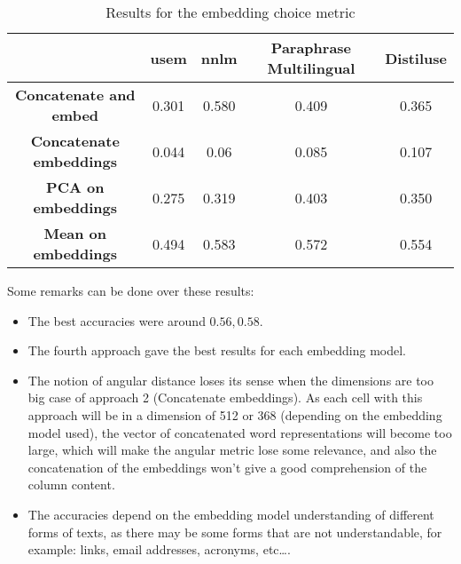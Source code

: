 \begin{table}[h]
    \begin{center}
        \begin{tabular}{|c | c | c | c| c|}
            \hline
                                            & \textbf{\acrshort{usem}}         &
            \textbf{\acrshort{nnlm}}        & \textbf{Paraphrase Multilingual} &
            \textbf{Distiluse}
            \\
            \hline

            \textbf{Concatenate and embed}  & 0.301                            & 0.580
                                            & 0.409                            & 0.365
            \\
            \hline

            \textbf{Concatenate embeddings} & 0.044                            & 0.06  &
            0.085                           & 0.107                                      \\
            \hline

            \textbf{PCA on embeddings}      & 0.275                            & 0.319
                                            & 0.403                            & 0.350
            \\
            \hline

            \textbf{Mean on embeddings}     & 0.494                            & 0.583
                                            & 0.572                            & 0.554
            \\
            \hline
        \end{tabular}
    \end{center}
    \caption{Results for the embedding choice metric}
    \label{table:embedding_metric_result}
\end{table}
Some remarks can be done over these results:
\begin{itemize}
    \item The best accuracies were around $0.56, 0.58$.
    \item The fourth approach gave the best results for each embedding model.
    \item The notion of angular distance loses its sense when the dimensions are
          too big case of approach 2 (Concatenate embeddings). As each cell with
          this approach will be in a dimension of 512 or 368 (depending on the
          embedding model used), the vector of concatenated word representations
          will become too large, which will make the angular metric lose some
          relevance, and also the concatenation of the embeddings won't give a
          good comprehension of the column content.
    \item The accuracies depend on the embedding model understanding of
          different forms of texts, as there may be some forms that are not
          understandable, for example: links, email addresses, acronyms, etc\ldots.

\end{itemize}


